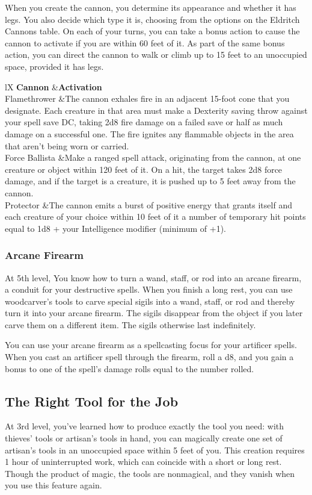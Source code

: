 \documentclass[letterpaper,openany,oneside,twocolumn]{book}
\begin{document}
When you create the cannon, you determine its appearance and whether it has legs. You also decide which type it is, choosing from the options on the Eldritch Cannons table. On each of your turns, you can take a bonus action to cause the cannon to activate if you are within 60 feet of it. As part of the same bonus action, you can direct the cannon to walk or climb up to 15 feet to an unoccupied space, provided it has legs.
\begin{DndTable}[header=Eldritch Cannon]{lX}
\textbf{Cannon}  	&\textbf{Activation}				\\
Flamethrower		&The cannon exhales fire in an adjacent 15-foot cone that you designate. Each creature in that area must make a Dexterity saving throw against your spell save DC, taking 2d8 fire damage on a failed save or half as much damage on a successful one. The fire ignites any flammable objects in the area that aren't being worn or carried.\\
Force Ballista		&Make a ranged spell attack, originating from the cannon, at one creature or object within 120 feet of it. On a hit, the target takes 2d8 force damage, and if the target is a creature, it is pushed up to 5 feet away from the cannon.\\
Protector			&The cannon emits a burst of positive energy that grants itself and each creature of your choice within 10 feet of it a number of temporary hit points equal to 1d8 + your Intelligence modifier (minimum of +1).\\
\end{DndTable}
\subsubsection*{Arcane Firearm}
At 5th level, You know how to turn a wand, staff, or rod into an arcane firearm, a conduit for your destructive spells. When you finish a long rest, you can use woodcarver's tools to carve special sigils into a wand, staff, or rod and thereby turn it into your arcane firearm. The sigils disappear from the object if you later carve them on a different item. The sigils otherwise last indefinitely.

You can use your arcane firearm as a spellcasting focus for your artificer spells. When you cast an artificer spell through the firearm, roll a d8, and you gain a bonus to one of the spell's damage rolls equal to the number rolled.
\subsection*{The Right Tool for the Job}
At 3rd level, you've learned how to produce exactly the tool you need: with thieves' tools or artisan's tools in hand, you can magically create one set of artisan's tools in an unoccupied space within 5 feet of you. This creation requires 1 hour of uninterrupted work, which can coincide with a short or long rest. Though the product of magic, the tools are nonmagical, and they vanish when you use this feature again.
\end{document}
